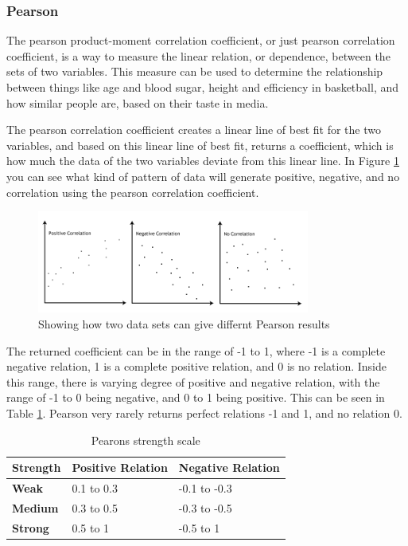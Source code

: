 \subsubsection{Pearson}

The pearson product-moment correlation coefficient, or just pearson correlation coefficient, is a way to measure the linear relation, or dependence, between the sets of two variables. This measure can be used to determine the relationship between things like age and blood sugar, height and efficiency in basketball, and how similar people are, based on their taste in media.

The pearson correlation coefficient creates a linear line of best fit for the two variables, and based on this linear line of best fit, returns a coefficient, which is how much the data of the two variables deviate from this linear line. In Figure \ref{Pearson2} you can see what kind of pattern of data will generate positive, negative, and no correlation using the pearson correlation coefficient.

\begin{figure}[htb]
\centering
\includegraphics[width=0.8\textwidth]{Images/pearson2.png}
\caption{Showing how two data sets can give differnt Pearson results}
\label{Pearson2}
\end{figure}

The returned coefficient can be in the range of -1 to 1, where -1 is a complete negative relation, 1 is a complete positive relation, and 0 is no relation. Inside this range, there is varying degree of positive and negative relation, with the range of -1 to 0 being negative, and 0 to 1 being positive. This can be seen in Table \ref{PearsonStr}. Pearson very rarely returns perfect relations -1 and 1, and no relation 0.

\begin{table}[htb]
\centering
\begin{tabular}{|l|l|l|} \hline
	\textbf{Strength} & \textbf{Positive Relation} & \textbf{Negative Relation} \\ \hline
	\textbf{Weak} & 0.1 to 0.3 & -0.1 to -0.3 \\ \hline
	\textbf{Medium} & 0.3 to 0.5 & -0.3 to -0.5 \\ \hline
	\textbf{Strong} & 0.5 to 1 & -0.5 to 1 \\ \hline
\end{tabular}
\caption{Pearons strength scale}
\label{PearsonStr}
\end{table}

